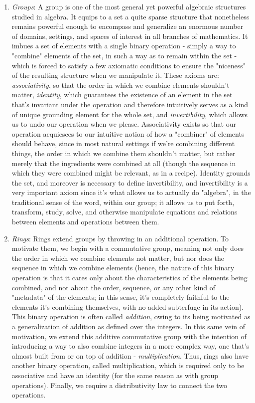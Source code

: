 \documentclass{article}
\begin{document}
\begin{enumerate}

    \item \textit{Groups}: A group is one of the most general yet powerful algebraic structures studied in algebra. It equips to a set a quite sparse structure that nonetheless remains powerful enough to encompass and generalize an enormous number of domains, settings, and spaces of interest in all branches of mathematics. It imbues a set of elements with a single binary operation - simply a way to "combine" elements of the set, in such a way as to remain within the set - which is forced to satisfy a few axiomatic conditions to ensure the "niceness" of the resulting structure when we manipulate it. These axioms are: \textit{associativity}, so that the order in which we combine elements shouldn't matter, \textit{identity}, which guarantees the existence of an element in the set that's invariant under the operation and therefore intuitively serves as a kind of unique grounding element for the whole set, and \textit{invertibility}, which allows us to undo our operation when we please. Associativity exists so that our operation acquiesces to our intuitive notion of how a "combiner" of elements should behave, since in most natural settings if we're combining different things, the order in which we combine them shouldn't matter, but rather merely that the ingredients were combined at all (though the sequence in which they were combined might be relevant, as in a recipe). Identity grounds the set, and moreover is necessary to define invertibility, and invertibility is a very important axiom since it's what allows us to actually do "algebra", in the traditional sense of the word, within our group; it allows us to put forth, transform, study, solve, and otherwise manipulate equations and relations between elements and operations between them.
    \item \textit{Rings}: Rings extend groups by throwing in an additional operation. To motivate them, we begin with a commutative group, meaning not only does the order in which we combine elements not matter, but nor does the sequence in which we combine elements (hence, the nature of this binary operation is that it cares only about the characteristics of the elements being combined, and not about the order, sequence, or any other kind of "metadata" of the elements; in this sense, it's completely faithful to the elements it's combining themselves, with no added subterfuge in its action). This binary operation is often called \textit{addition}, owing to its being motivated as a generalization of addition as defined over the integers. In this same vein of motivation, we extend this additive commutative group with the intention of introducing a way to also combine integers in a more complex way, one that's almost built from or on top of addition - \textit{multiplication}. Thus, rings also have another binary operation, called multiplication, which is required only to be associative and have an identity (for the same reason as with group operations). Finally, we require a distributivity law to connect the two operations.

\end{enumerate}
\end{document}
